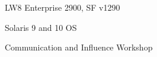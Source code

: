 \documentclass[10pt]{article}
\newenvironment{innerlist}[1][\enskip\textbullet]%
        {\begin{compactitem}[#1]}{\end{compactitem}}
\newcommand{\blankline}{\quad\pagebreak[2]}
\begin{document}
\begin{innerlist}
\item LW8 Enterprise 2900, SF v1290
\item Solaris 9 and 10 OS
\end{innerlist}

\blankline

\begin{innerlist}
\item Communication and Influence Workshop
\end{innerlist}
\end{document}
